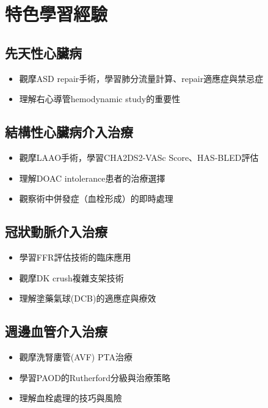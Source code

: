 \documentclass[12pt,a4paper]{article}
\begin{document}
\section{特色學習經驗}

\subsection{先天性心臟病}

\begin{itemize}
\item 觀摩ASD repair手術，學習肺分流量計算、repair適應症與禁忌症
\item 理解右心導管hemodynamic study的重要性
\end{itemize}

\subsection{結構性心臟病介入治療}

\begin{itemize}
\item 觀摩LAAO手術，學習CHA2DS2-VASc Score、HAS-BLED評估
\item 理解DOAC intolerance患者的治療選擇
\item 觀察術中併發症（血栓形成）的即時處理
\end{itemize}

\subsection{冠狀動脈介入治療}

\begin{itemize}
\item 學習FFR評估技術的臨床應用
\item 觀摩DK crush複雜支架技術
\item 理解塗藥氣球(DCB)的適應症與療效
\end{itemize}

\subsection{週邊血管介入治療}

\begin{itemize}
\item 觀摩洗腎廔管(AVF) PTA治療
\item 學習PAOD的Rutherford分級與治療策略
\item 理解血栓處理的技巧與風險
\end{itemize}
\end{document}
